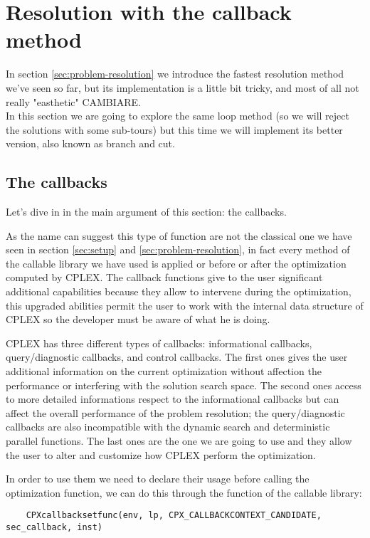 \section{Resolution with the callback method}
\label{sec:branch_and_cut}
In section \ref{sec:problem-resolution} we introduce the fastest resolution method we've seen so far, but its implementation is a little bit tricky, and most of all not really "easthetic" CAMBIARE.\\
In this section we are going to explore the same loop method (so we will reject the solutions with some sub-tours) but this time we will implement its better version, also known as branch and cut.

\subsection{The callbacks}
Let's dive in in the main argument of this section: the callbacks.

As the name can suggest this type of function are not the classical one we have seen in section \ref{sec:setup} and \ref{sec:problem-resolution}, in fact every method of the callable library we have used is applied or before or after the optimization computed by CPLEX. The callback functions give to the user significant additional capabilities because they allow to intervene during the optimization, this upgraded abilities permit the user to work with the internal data structure of CPLEX so the developer must be aware of what he is doing.

CPLEX has three different types of callbacks: informational callbacks, query/diagnostic callbacks, and control callbacks. The first ones gives the user additional information on the current optimization without affection the performance or interfering with the solution search space. The second ones access to more detailed informations respect to the informational callbacks but can affect the overall performance of the problem resolution; the query/diagnostic callbacks are also incompatible with the dynamic search and deterministic parallel functions. The last ones are the one we are going to use and they allow the user to alter and customize how CPLEX perform the optimization.

In order to use them we need to declare their usage before calling the optimization function, we can do this through the function of the callable library:

\begin{lstlisting}
	CPXcallbacksetfunc(env, lp, CPX_CALLBACKCONTEXT_CANDIDATE, sec_callback, inst)
\end{lstlisting}

